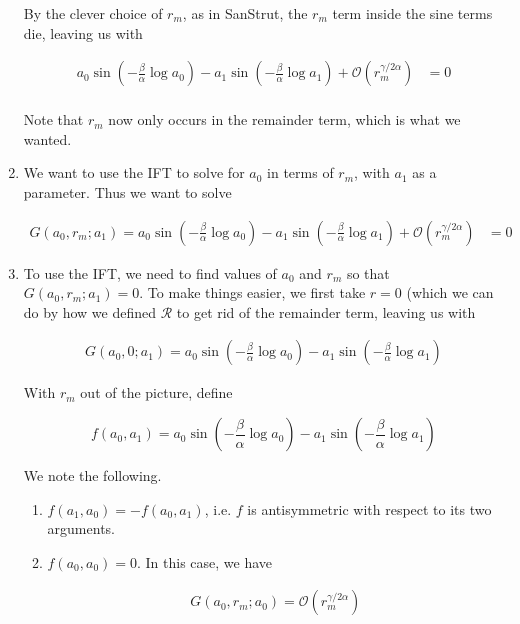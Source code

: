 \documentclass[12pt]{article}
\begin{document}
\begin{enumerate}
By the clever choice of $r_m$, as in SanStrut, the $r_m$ term inside the sine terms die, leaving us with

\begin{align}\label{jumpeq4}
a_0 \sin \left( - \frac{\beta}{\alpha} \log a_0 \right) - a_1 \sin \left( - \frac{\beta}{\alpha} \log a_1 \right) + \mathcal{O}(r_m^{\gamma / 2 \alpha}) &= 0 \\
\end{align}

Note that $r_m$ now only occurs in the remainder term, which is what we wanted.

\item We want to use the IFT to solve for $a_0$ in terms of $r_m$, with $a_1$ as a parameter. Thus we want to solve

\begin{align*}
G(a_0, r_m; a_1) = 
a_0 \sin \left( - \frac{\beta}{\alpha} \log a_0 \right) - a_1 \sin \left( - \frac{\beta}{\alpha} \log a_1 \right) + \mathcal{O}(r_m^{\gamma / 2 \alpha}) &= 0
\end{align*}

\item To use the IFT, we need to find values of $a_0$ and $r_m$ so that $G(a_0, r_m; a_1) = 0$. To make things easier, we first take $r = 0$ (which we can do by how we defined $\mathcal{R}$ to get rid of the remainder term, leaving us with

\begin{align*}
G(a_0, 0; a_1) = 
a_0 \sin \left( - \frac{\beta}{\alpha} \log a_0 \right) - a_1 \sin \left( - \frac{\beta}{\alpha} \log a_1 \right)
\end{align*}

With $r_m$ out of the picture, define

\begin{equation}
f(a_0, a_1) = 
a_0 \sin \left( - \frac{\beta}{\alpha} \log a_0 \right) - a_1 \sin \left( - \frac{\beta}{\alpha} \log a_1 \right)
\end{equation}

We note the following.

\begin{enumerate}
	\item $f(a_1, a_0) = -f(a_0, a_1)$, i.e. $f$ is antisymmetric with respect to its two arguments.

	\item $f(a_0, a_0) = 0$. In this case, we have

	\begin{align*}
	G(a_0, r_m; a_0) = \mathcal{O}(r_m^{\gamma / 2 \alpha})
	\end{align*}


\end{enumerate}
\end{enumerate}
\end{document}
